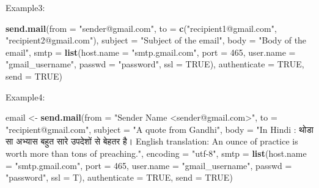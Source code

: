 \documentclass[]{book}
\newenvironment{Shaded}{\begin{snugshade}}{\end{snugshade}}
\newcommand{\KeywordTok}[1]{\textcolor[rgb]{0.13,0.29,0.53}{\textbf{#1}}}
\newcommand{\DataTypeTok}[1]{\textcolor[rgb]{0.13,0.29,0.53}{#1}}
\newcommand{\DecValTok}[1]{\textcolor[rgb]{0.00,0.00,0.81}{#1}}
\newcommand{\StringTok}[1]{\textcolor[rgb]{0.31,0.60,0.02}{#1}}
\newcommand{\OtherTok}[1]{\textcolor[rgb]{0.56,0.35,0.01}{#1}}
\newcommand{\NormalTok}[1]{#1}
\theoremstyle{definition}
\theoremstyle{definition}
\theoremstyle{definition}
\theoremstyle{remark}
\begin{document}
Example3:

\begin{Shaded}
\begin{Highlighting}[]
\KeywordTok{send.mail}\NormalTok{(}\DataTypeTok{from =} \StringTok{"sender@gmail.com"}\NormalTok{,}
          \DataTypeTok{to =} \KeywordTok{c}\NormalTok{(}\StringTok{"recipient1@gmail.com"}\NormalTok{, }\StringTok{"recipient2@gmail.com"}\NormalTok{),}
          \DataTypeTok{subject =} \StringTok{"Subject of the email"}\NormalTok{,}
          \DataTypeTok{body =} \StringTok{"Body of the email"}\NormalTok{,}
          \DataTypeTok{smtp =} \KeywordTok{list}\NormalTok{(}\DataTypeTok{host.name =} \StringTok{"smtp.gmail.com"}\NormalTok{, }\DataTypeTok{port =} \DecValTok{465}\NormalTok{, }\DataTypeTok{user.name =} \StringTok{"gmail_username"}\NormalTok{, }\DataTypeTok{passwd =} \StringTok{"password"}\NormalTok{, }\DataTypeTok{ssl =} \OtherTok{TRUE}\NormalTok{),}
          \DataTypeTok{authenticate =} \OtherTok{TRUE}\NormalTok{,}
          \DataTypeTok{send =} \OtherTok{TRUE}\NormalTok{)}
\end{Highlighting}
\end{Shaded}

Example4:

\begin{Shaded}
\begin{Highlighting}[]

\NormalTok{email <-}\StringTok{ }\KeywordTok{send.mail}\NormalTok{(}\DataTypeTok{from =} \StringTok{"Sender Name <sender@gmail.com>"}\NormalTok{,}
                   \DataTypeTok{to =} \StringTok{"recipient@gmail.com"}\NormalTok{,}
                   \DataTypeTok{subject =} \StringTok{"A quote from Gandhi"}\NormalTok{,}
                   \DataTypeTok{body =} \StringTok{"In Hindi :  थोडा सा अभ्यास बहुत सारे उपदेशों से बेहतर है।}
\StringTok{                   English translation: An ounce of practice is worth more than tons of preaching."}\NormalTok{,}
                   \DataTypeTok{encoding =} \StringTok{"utf-8"}\NormalTok{,}
                   \DataTypeTok{smtp =} \KeywordTok{list}\NormalTok{(}\DataTypeTok{host.name =} \StringTok{"smtp.gmail.com"}\NormalTok{, }\DataTypeTok{port =} \DecValTok{465}\NormalTok{, }\DataTypeTok{user.name =} \StringTok{"gmail_username"}\NormalTok{, }\DataTypeTok{passwd =} \StringTok{"password"}\NormalTok{, }\DataTypeTok{ssl =}\NormalTok{ T),}
               \DataTypeTok{authenticate =} \OtherTok{TRUE}\NormalTok{,}
                   \DataTypeTok{send =} \OtherTok{TRUE}\NormalTok{)}
\end{Highlighting}
\end{Shaded}
\end{document}
